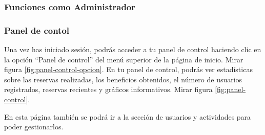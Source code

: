 \newpage
\subsubsection{Funciones como Administrador}
\hrulefill

\subsubsection{Panel de contol}
Una vez has iniciado sesión, podrás acceder a tu panel de control haciendo clic en la opción “Panel de control” del menú superior de la página de inicio. Mirar figura \ref{fig:panel-control-opcion}.
En tu panel de control, podrás ver estadísticas sobre las reservas realizadas, los beneficios obtenidos, el número de usuarios registrados, reservas recientes y gráficos informativos. Mirar figura \ref{fig:panel-control}.

En esta página también se podrá ir a la sección de usuarios y actividades para poder gestionarlos.

